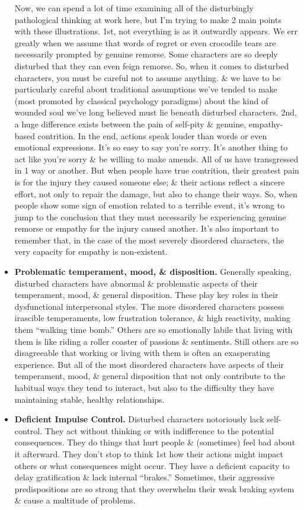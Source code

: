 \documentclass{article}
\numberwithin{equation}{section}
\begin{document}
\begin{itemize}
\begin{enumerate}
	\end{enumerate}
	Now, we can spend a lot of time examining all of the disturbingly pathological thinking at work here, but I'm trying to make 2 main points with these illustrations. 1st, not everything is as it outwardly appears. We err greatly when we assume that words of regret or even crocodile tears are necessarily prompted by genuine remorse. Some characters are so deeply disturbed that they can even feign remorse. So, when it comes to disturbed characters, you must be careful not to assume anything. \& we have to be particularly careful about traditional assumptions we've tended to make (most promoted by classical psychology paradigms) about the kind of wounded soul we've long believed must lie beneath disturbed characters. 2nd, a huge difference exists between the pain of self-pity \& genuine, empathy-based contrition. In the end, actions speak louder than words or even emotional expressions. It's so easy to say you're sorry. It's another thing to act like you're sorry \& be willing to make amends. All of us have transgressed in 1 way or another. But when people have true contrition, their greatest pain is for the injury they caused someone else; \& their actions reflect a sincere effort, not only to repair the damage, but also to change their ways. So, when people show some sign of emotion related to a terrible event, it's wrong to jump to the conclusion that they must necessarily be experiencing genuine remorse or empathy for the injury caused another. It's also important to remember that, in the case of the most severely disordered characters, the very capacity for empathy is non-existent.
	\item \textbf{Problematic temperament, mood, \& disposition.} Generally speaking, disturbed characters have abnormal \& problematic aspects of their temperament, mood, \& general disposition. These play key roles in their dysfunctional interpersonal styles. The more disordered characters possess irascible temperaments, low frustration tolerance, \& high reactivity, making them ``walking time bomb.'' Others are so emotionally labile that living with them is like riding a roller coaster of passions \& sentiments. Still others are so disagreeable that working or living with them is often an exasperating experience. But all of the most disordered characters have aspects of their temperament, mood, \& general disposition that not only contribute to the habitual ways they tend to interact, but also to the difficulty they have maintaining stable, healthy relationships.
	\item \textbf{Deficient Impulse Control.} Disturbed characters notoriously lack self-control. They act without thinking or with indifference to the potential consequences. They do things that hurt people \& (sometimes) feel bad about it afterward. They don't stop to think 1st how their actions might impact others or what consequences might occur. They have a deficient capacity to delay gratification \& lack internal ``brakes.'' Sometimes, their aggressive predispositions are so strong that they overwhelm their weak braking system \& cause a multitude of problems.

\end{itemize}
\end{document}
